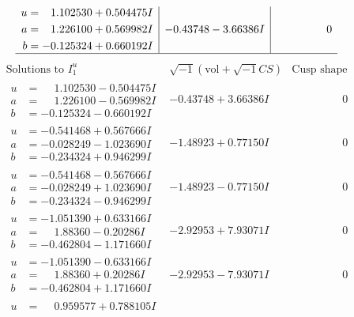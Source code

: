 \documentclass[1p]{elsarticle_modified}
\theoremstyle{definition}
\newcommand{\I}{\sqrt{-1}}
\begin{document}
$$\begin{array}{c|c|c}
\begin{aligned}
u &= \phantom{-}1.102530 + 0.504475 I \\
a &= \phantom{-}1.226100 + 0.569982 I \\
b &= -0.125324 + 0.660192 I\end{aligned}
 & -0.43748 - 3.66386 I & \phantom{-0.000000 } 0\\
 \hline 
 \end{array}$$\newpage$$\begin{array}{c|c|c}  
\text{Solutions to }I^u_{1}& \I (\text{vol} + \sqrt{-1}CS) & \text{Cusp shape}\\
 \hline 
\begin{aligned}
u &= \phantom{-}1.102530 - 0.504475 I \\
a &= \phantom{-}1.226100 - 0.569982 I \\
b &= -0.125324 - 0.660192 I\end{aligned}
 & -0.43748 + 3.66386 I & \phantom{-0.000000 } 0 \\ \hline\begin{aligned}
u &= -0.541468 + 0.567666 I \\
a &= -0.028249 - 1.023690 I \\
b &= -0.234324 + 0.946299 I\end{aligned}
 & -1.48923 + 0.77150 I & \phantom{-0.000000 } 0 \\ \hline\begin{aligned}
u &= -0.541468 - 0.567666 I \\
a &= -0.028249 + 1.023690 I \\
b &= -0.234324 - 0.946299 I\end{aligned}
 & -1.48923 - 0.77150 I & \phantom{-0.000000 } 0 \\ \hline\begin{aligned}
u &= -1.051390 + 0.633166 I \\
a &= \phantom{-}1.88360 - 0.20286 I \\
b &= -0.462804 - 1.171660 I\end{aligned}
 & -2.92953 + 7.93071 I & \phantom{-0.000000 } 0 \\ \hline\begin{aligned}
u &= -1.051390 - 0.633166 I \\
a &= \phantom{-}1.88360 + 0.20286 I \\
b &= -0.462804 + 1.171660 I\end{aligned}
 & -2.92953 - 7.93071 I & \phantom{-0.000000 } 0 \\ \hline\begin{aligned}
u &= \phantom{-}0.959577 + 0.788105 I \\

\end{aligned}
\end{array}$$
\end{document}

